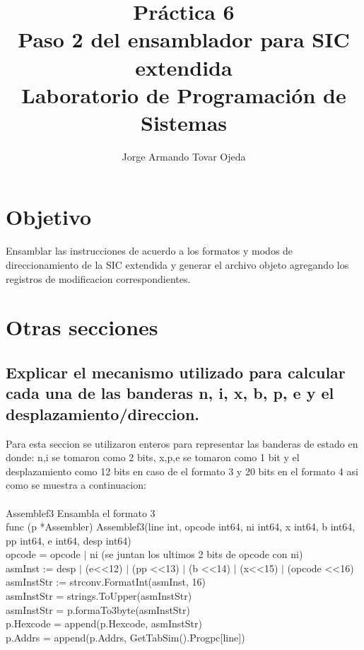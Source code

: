 \documentclass[10pt,letterpaper,oneside]{article}
\title{Pr\'actica 6 \\ Paso 2 del ensamblador para SIC extendida \\  Laboratorio de Programaci\'on de Sistemas}
\author{Jorge Armando Tovar Ojeda}
\begin{document}
\maketitle

\section{Objetivo}
Ensamblar las instrucciones de acuerdo a los formatos y modos de direccionamiento de la SIC extendida y generar el archivo objeto agregando los registros de modificacion correspondientes.


\section{Otras secciones}
\subsection{Explicar el mecanismo utilizado para calcular cada una de las banderas n, i, x, b, p, e y el desplazamiento/direccion.}
Para esta seccion se utilizaron enteros para representar las banderas de estado en donde: n,i se tomaron como 2 bits, x,p,e se tomaron como 1 bit y el desplazamiento como 12 bits en caso de el formato 3 y 20 bits en el formato 4 asi como se muestra a continuacion:
\\
\\
Assemblef3 Ensambla el formato 3\\
func (p *Assembler) Assemblef3(line int, opcode int64, ni int64, x int64, b int64, pp int64, e int64, desp int64) \\
\indent	opcode = opcode $|$ ni (se juntan los ultimos 2 bits de opcode con ni)\\
\indent	asmInst := desp $|$ (e\textless\textless12) $|$ (pp \textless\textless 13) $|$ (b \textless\textless 14) $|$ (x\textless\textless 15) $|$ (opcode \textless\textless 16)  \\
\indent	asmInstStr := strconv.FormatInt(asmInst, 16)\\
\indent	asmInstStr = strings.ToUpper(asmInstStr)\\
\indent asmInstStr = p.formaTo3byte(asmInstStr)\\
\indent	p.Hexcode = append(p.Hexcode, asmInstStr)\\
\indent	p.Addrs = append(p.Addrs, GetTabSim().Progpc[line])\\
\\
\\
\\
\end{document}
